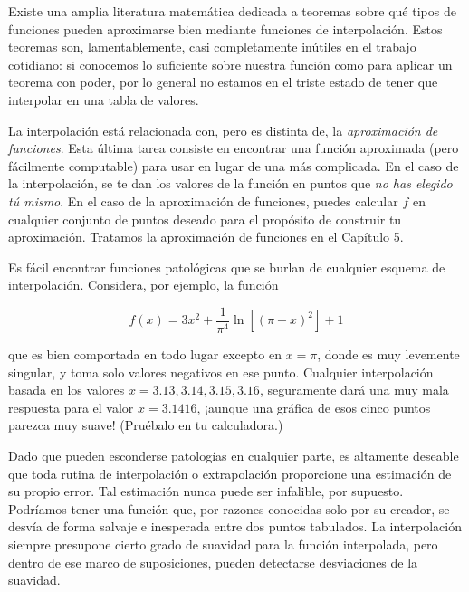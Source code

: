 \documentclass[10pt,a4paper]{book}
\begin{document}
\medskip

Existe una amplia literatura matemática dedicada a teoremas sobre qué tipos de funciones pueden aproximarse bien mediante funciones de interpolación. Estos teoremas son, lamentablemente, casi completamente inútiles en el trabajo cotidiano: si conocemos lo suficiente sobre nuestra función como para aplicar un teorema con poder, por lo general no estamos en el triste estado de tener que interpolar en una tabla de valores.

\medskip

La interpolación está relacionada con, pero es distinta de, la \textit{aproximación de funciones}. Esta última tarea consiste en encontrar una función aproximada (pero fácilmente computable) para usar en lugar de una más complicada. En el caso de la interpolación, se te dan los valores de la función en puntos que \textit{no has elegido tú mismo}. En el caso de la aproximación de funciones, puedes calcular \( f \) en cualquier conjunto de puntos deseado para el propósito de construir tu aproximación. Tratamos la aproximación de funciones en el Capítulo 5.

\medskip

Es fácil encontrar funciones patológicas que se burlan de cualquier esquema de interpolación. Considera, por ejemplo, la función

\[
f(x) = 3x^2 + \frac{1}{\pi^4} \ln \left[ (\pi - x)^2 \right] + 1 \tag{3.0.1}
\]

que es bien comportada en todo lugar excepto en \( x = \pi \), donde es muy levemente singular, y toma solo valores negativos en ese punto. Cualquier interpolación basada en los valores \( x = 3.13, 3.14, 3.15, 3.16 \), seguramente dará una muy mala respuesta para el valor \( x = 3.1416 \), ¡aunque una gráfica de esos cinco puntos parezca muy suave! (Pruébalo en tu calculadora.)

\medskip

Dado que pueden esconderse patologías en cualquier parte, es altamente deseable que toda rutina de interpolación o extrapolación proporcione una estimación de su propio error. Tal estimación nunca puede ser infalible, por supuesto. Podríamos tener una función que, por razones conocidas solo por su creador, se desvía de forma salvaje e inesperada entre dos puntos tabulados. La interpolación siempre presupone cierto grado de suavidad para la función interpolada, pero dentro de ese marco de suposiciones, pueden detectarse desviaciones de la suavidad.

\medskip
\end{document}
